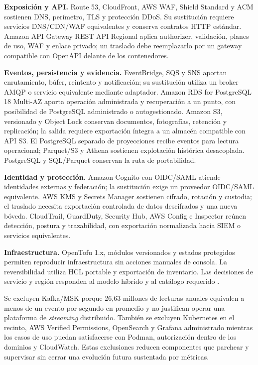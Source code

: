 \textbf{Exposición y API.} Route 53, CloudFront, AWS WAF, Shield Standard y ACM sostienen DNS, perímetro, TLS y protección DDoS. Su sustitución requiere servicios DNS/CDN/WAF equivalentes y conserva contratos HTTP estándar. Amazon API Gateway REST API Regional aplica authorizer, validación, planes de uso, WAF y enlace privado; un traslado debe reemplazarlo por un gateway compatible con OpenAPI delante de los contenedores.

\textbf{Eventos, persistencia y evidencia.} EventBridge, SQS y SNS aportan enrutamiento, búfer, reintento y notificación; su sustitución utiliza un broker AMQP o servicio equivalente mediante adaptador. Amazon RDS for PostgreSQL 18 Multi-AZ aporta operación administrada y recuperación a un punto, con posibilidad de PostgreSQL administrado o autogestionado. Amazon S3, versionado y Object Lock conservan documentos, fotografías, retención y replicación; la salida requiere exportación íntegra a un almacén compatible con API S3. El PostgreSQL separado de proyecciones recibe eventos para lectura operacional; Parquet/S3 y Athena sostienen explotación histórica desacoplada. PostgreSQL y SQL/Parquet conservan la ruta de portabilidad.

\textbf{Identidad y protección.} Amazon Cognito con OIDC/SAML atiende identidades externas y federación; la sustitución exige un proveedor OIDC/SAML equivalente. AWS KMS y Secrets Manager sostienen cifrado, rotación y custodia; el traslado necesita exportación controlada de datos descifrados y una nueva bóveda. CloudTrail, GuardDuty, Security Hub, AWS Config e Inspector reúnen detección, postura y trazabilidad, con exportación normalizada hacia SIEM o servicios equivalentes.

\textbf{Infraestructura.} OpenTofu 1.x, módulos versionados y estados protegidos permiten reproducir infraestructura sin acciones manuales de consola. La reversibilidad utiliza HCL portable y exportación de inventario. Las decisiones de servicio y región responden al modelo híbrido y al catálogo requerido \parencites[art.~16, pp.~11--12]{pucv-admin}{aws-regiones,aws-rds-regiones}.

Se excluyen Kafka/MSK porque 26,63 millones de lecturas anuales equivalen a menos de un evento por segundo en promedio y no justifican operar una plataforma de \emph{streaming} distribuido. También se excluyen Kubernetes en el recinto, AWS Verified Permissions, OpenSearch y Grafana administrado mientras los casos de uso puedan satisfacerse con Podman, autorización dentro de los dominios y CloudWatch. Estas exclusiones reducen componentes que parchear y supervisar sin cerrar una evolución futura sustentada por métricas.

